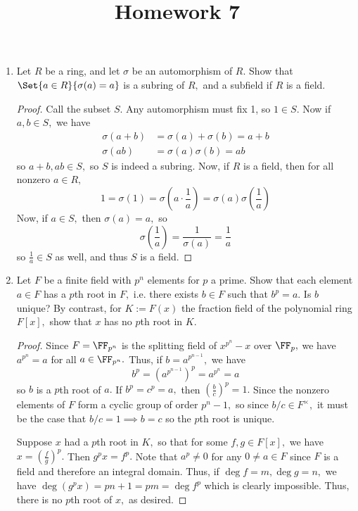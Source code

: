 \documentclass{article}
\begin{document}
\title{Homework 7}
\maketitle
\thispagestyle{fancy}

\begin{enumerate}
	\item Let $R$ be a ring, and let $\sigma$ be an automorphism of $R.$ Show that $\Set{a\in R}{\sigma(a)=a}$ is a subring of $R,$ and a subfield if $R$ is a field.
		\begin{proof}
			Call the subset $S.$ Any automorphism must fix 1, so $1\in S.$ Now if $a, b\in S,$ we have
			\begin{align*}
				\sigma(a+b) &= \sigma(a)+\sigma(b) = a+b \\
				\sigma(ab) &= \sigma(a)\sigma(b)=ab
			\end{align*}
			so $a+b, ab\in S,$ so $S$ is indeed a subring. Now, if $R$ is a field, then for all nonzero $a\in R,$
			\[1=\sigma(1)=\sigma\left( a\cdot \frac{1}{a} \right) = \sigma(a) \sigma\left( \frac{1}{a} \right)\]
			Now, if $a\in S,$ then $\sigma(a)=a,$ so
			\[\sigma\left( \frac{1}{a} \right) = \frac{1}{\sigma(a)}=\frac{1}{a}\]
			so $\frac{1}{a}\in S$ as well, and thus $S$ is a field.
		\end{proof}

	\item Let $F$ be a finite field with $p^n$ elements for $p$ a prime. Show that each element $a\in F$ has a $p$th root in $F,$ i.e. there exists $b\in F$ such that $b^p=a.$ Is $b$ unique? By contrast, for $K:=F(x)$ the fraction field of the polynomial ring $F[x],$ show that $x$ has no $p$th root in $K.$
		\begin{proof}
			Since $F=\FF_{p^n}$ is the splitting field of $x^{p^n}-x$ over $\FF_p,$ we have $a^{p^n}=a$ for all $a\in \FF_{p^n}.$ Thus, if $b=a^{p^{n-1}},$ we have
			\[b^p=(a^{p^{n-1}})^p = a^{p^n}=a\]
			so $b$ is a $p$th root of $a.$ If $b^p=c^p=a,$ then $\left( \frac{b}{c} \right)^p=1.$ Since the nonzero elements of $F$ form a cyclic group of order $p^n-1,$ so since $b/c\in F^\times,$ it must be the case that $b/c=1\implies b=c$ so the $p$th root is unique.

			Suppose $x$ had a $p$th root in $K,$ so that for some $f, g\in F[x],$ we have $x=\left( \frac{f}{g} \right)^p.$ Then $g^px=f^p.$ Note that $a^p\neq 0$ for any $0\neq a\in F$ since $F$ is a field and therefore an integral domain. Thus, if $\deg f = m, \deg g=n,$ we have $\deg (g^px)=pn+1=pm=\deg f^p$ which is clearly impossible. Thus, there is no $p$th root of $x,$ as desired.
		\end{proof}
		
\end{enumerate}
\end{document}
